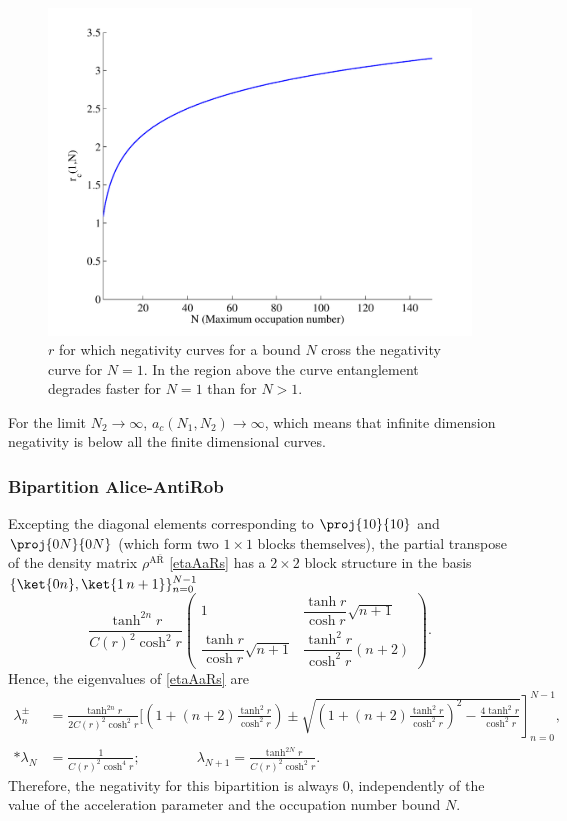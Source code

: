 \begin{figure}[h]
\begin{center}
\includegraphics[width=.85\textwidth]{rcritical}
\end{center}
\caption{$r$ for which negativity curves for a bound $N$ cross the negativity curve for $N=1$. In the region above the curve entanglement degrades faster for $N=1$ than for $N>1$.}
\label{rcritical}
\end{figure}

For the limit $N_2\rightarrow\infty$,  $a_c(N_1,N_2)\rightarrow\infty$, which means that infinite dimension negativity is below all the finite dimensional curves.


\subsubsection{Bipartition Alice-AntiRob}

Excepting the diagonal elements corresponding to $\proj{10}{10}$ and $\proj{0N}{0N}$  (which form two $1\times1$ blocks themselves), the partial transpose of the density matrix $\rho^{\text{A}{\bar{\text{R}}}}$ \eqref{etaAaRs} has a $2\times2$ block structure in the basis $\{ \ket{0 n},\ket{1\, n+1}\}_{n=0}^{N-1}$ 
\begin{equation}\label{blocksbosAaR}
\frac{\tanh^{2n}r}{C(r)^2\cosh^2 r}
\left(\!\begin{array}{cc}
1 & \dfrac{\tanh r}{\cosh r}\sqrt{n+1}\\[3mm]
\dfrac{\tanh r}{\cosh r}\sqrt{n+1} & \dfrac{\tanh^2 r}{\cosh^2r}(n+2)
\end{array}\!\right).
\end{equation}
Hence, the eigenvalues of \eqref{etaAaRs} are
\begin{align}
\nonumber\lambda^{\pm}_n&\!=\!\frac{\tanh^{2n}r}{2C(r)^2\cosh^2 r}\Bigg[\!\left(1\!+\!(n\!+\!2)\frac{\tanh^2 r}{\cosh^2 r}\right)\left.\!\!\pm\sqrt{\!\left(1+(n+2)\frac{\tanh^2 r}{\cosh^2 r}\right)^2\!\!\!-\frac{4\tanh^2 r}{\cosh^2 r}}\!\right]_{n=0}^{N-1}\!\!\!\!,\nonumber\\*
\lambda_N&=\frac{1}{C(r)^2\cosh^4 r};\qquad\qquad \lambda_{N+1}=\frac{\tanh^{2N}r}{C(r)^2\cosh^2 r}.
\end{align}
Therefore, the negativity for this bipartition is always $0$, independently of the value of the acceleration parameter and the occupation number bound $N$.

